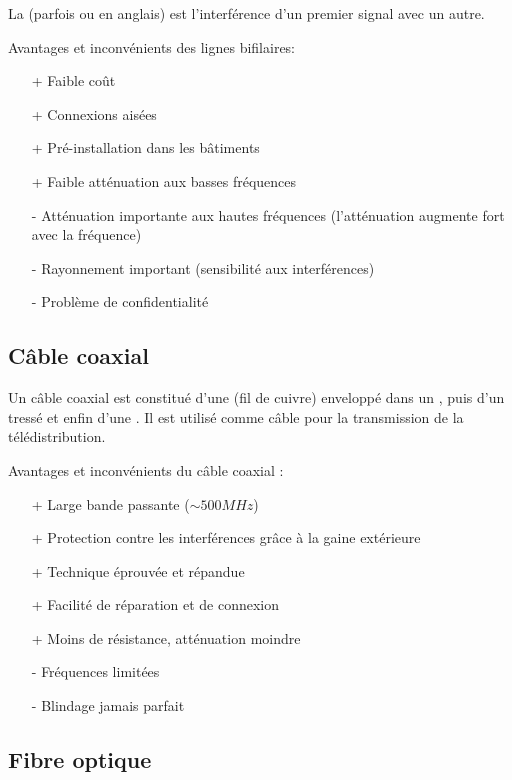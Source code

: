 La  (parfois  ou  en anglais) est l'interférence d'un premier signal avec un autre.

Avantages et inconvénients des lignes bifilaires:
\begin{itemize}
	\item[+] Faible coût
	\item[+] Connexions aisées
	\item[+] Pré-installation dans les bâtiments
	\item[+] Faible atténuation aux basses fréquences
	\item[-] Atténuation importante aux hautes fréquences (l'atténuation augmente fort avec la fréquence)
	\item[-] Rayonnement important (sensibilité aux interférences)
	\item[-] Problème de confidentialité
\end{itemize}

\newpage
\subsection{Câble coaxial}

Un câble coaxial est constitué d'une  (fil de cuivre) enveloppé dans un , puis d'un  tressé et enfin d'une . Il est utilisé comme câble pour la transmission de la télédistribution.

Avantages et inconvénients du câble coaxial :
\begin{itemize}
	\item[+] Large bande passante ($\sim 500 MHz$)
	\item[+] Protection contre les interférences grâce à la gaine extérieure
	\item[+] Technique éprouvée et répandue
	\item[+] Facilité de réparation et de connexion
	\item[+] Moins de résistance, atténuation moindre
	\item[-] Fréquences limitées
	\item[-] Blindage jamais parfait
\end{itemize}

\subsection{Fibre optique}

